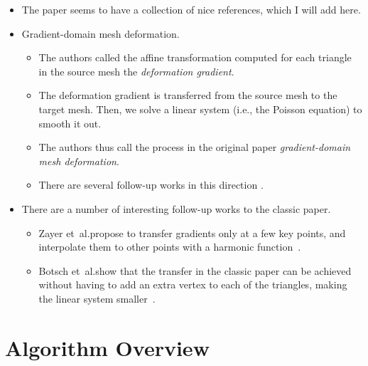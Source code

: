 \documentclass[10pt]{article}
\newcommand{\etal}{{et~al.}}
\begin{document}
\begin{itemize}
    \item The paper seems to have a collection of nice references, which I will add here.
    
    \item Gradient-domain mesh deformation.
    \begin{itemize}
        \item The authors called the affine transformation computed for each triangle in the source mesh the \emph{deformation gradient}.
        
        \item The deformation gradient is transferred from the source mesh to the target mesh. Then, we solve a linear system (i.e., the Poisson equation) to smooth it out. 
        
        \item The authors thus call the process in the original paper \emph{gradient-domain mesh deformation}.
        
        \item There are several follow-up works in this direction \cite{Yu:2004:MeshEditing, Sorkine:2004:LSE, Botsch:2008}.
    \end{itemize}
        
    
    \item There are a number of interesting follow-up works to the classic paper.
    \begin{itemize}
        \item Zayer \etal propose to transfer gradients only at a few key points, and interpolate them to other points with a harmonic function~\cite{Zayer:2005}.
        
        \item Botsch \etal show that the transfer in the classic paper can be achieved without having to add an extra vertex to each of the triangles, making the linear system smaller~\cite{Botsch:2006:DTDPSE}.
    \end{itemize}
\end{itemize}

\section{Algorithm Overview}
\end{document}
